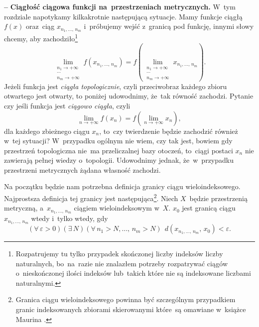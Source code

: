 \documentclass[a4paper,11pt]{article}
\newcommand{\ld}{\ldots}
\newcommand{\ra}{\rightarrow}
\newcommand{\wtw}{wtedy i~tylko wtedy}
\newcommand{\veps}{\varepsilon}
\newcommand{\Lim}{\lim\limits}
\newcommand{\tb}{\textbf}
\newcommand{\noi}{\noindent}
\newcommand{\start}{\noi \tb{--} {}}
\begin{document}
\start \tb{Ciągłość ciągowa funkcji na~przestrzeniach metrycznych.}
W~tym rozdziale napotykamy kilkakrotnie następującą sytuacje. Mamy
funkcje ciągłą $f( x )$ oraz~ciąg $x_{ n_{ 1 }, \ld, \, n_{ m } }$
i~próbujemy wejść z~granicą pod funkcję, innymi słowy chcemy, aby
zachodziło\footnote{Rozpatrujemy tu tylko przypadek skończonej liczby
  indeksów liczby naturalnych, bo~na~razie nie znalazłem potrzeby
  rozpatrywać ciągów o~nieskończonej ilości indeksów lub~takich które
  nie są indeksowane liczbami naturalnymi.}
\begin{equation*}
  \Lim_{ \substack{ n_{ 1 } \ra +\infty \\ \cdots \\  n_{ m } \ra +\infty } }
  f( x_{ n_{ 1 }, \ld, \, n_{ m } } )
  = f( \Lim_{ \substack{ n_{ 1 } \ra +\infty \\ \cdots \\ n_{ m } \ra +\infty } }
  x_{ n_{ 1 }, \ld, \, n_{ m } } ).
\end{equation*}
Jeżeli funkcja jest \emph{ciągła topologicznie}, czyli przeciwobraz
każdego zbioru otwartego jest otwarty, to poniżej udowodnimy, że~tak
równość zachodzi. Pytanie czy jeśli funkcja jest \emph{ciągowo
  ciągła}, czyli
\begin{equation*}
  \Lim_{ n \ra +\infty } f( x_{ n } ) = f( \Lim_{ n \ra +\infty } x_{ n } ),
\end{equation*}
dla każdego zbieżnego ciągu $x_{ n }$, to~czy twierdzenie będzie
zachodzić również w~tej sytuacji? W~przypadku ogólnym nie wiem, czy
tak jest, bowiem gdy przestrzeń topologiczna nie~ma przeliczalnej bazy
otoczeń, to~ciągi postaci $x_{ n }$ nie zawierają pełnej wiedzy
o~topologii. Udowodnimy jednak, że~w~przypadku przestrzeni metrycznych
żądana własność zachodzi.

Na początku będzie nam potrzebna definicja granicy ciągu
wieloindeksowego. Najprostsza definicja tej granicy jest
następująca\footnote{Granica ciągu wieloindeksowego powinna być
  szczególnym przypadkiem granic indeksowanych zbiorami skierowanymi
  które~są omawiane w~książce Maurina \cite{Maurin74}.}. Niech
$X$~będzie przestrzenią metryczną, a~$x_{ n_{ 1 }, \ld, \, n_{ m } }$
ciągiem wieloindeksowym w~$X$. $x_{ 0 }$ jest granicą ciągu
$x_{ n_{ 1 }, \ld, \, n_{ m } }$ \wtw, gdy
\begin{equation*}
  ( \forall \, \veps > 0) ( \exists \, N )
  ( \forall \, n_{ 1 } > N, \ld, \, n_{ m } > N ) \;\,
  d( x_{ n_{ 1 }, \ld, \, n_{ m } }, \, x_{ 0 } ) < \veps.
\end{equation*}
\end{document}
